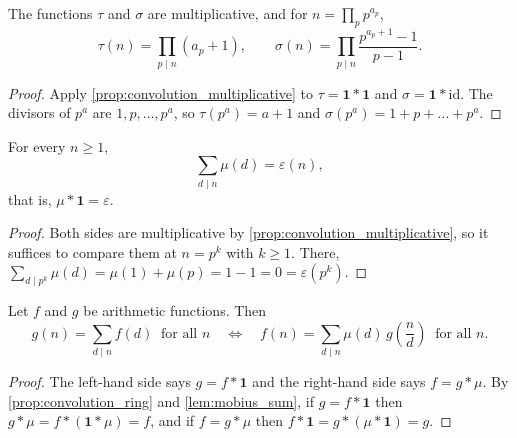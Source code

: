 \begin{corollary}\label{cor:tau_sigma}
    The functions $\tau$ and $\sigma$ are multiplicative, and for $n = \prod_p p^{a_p}$,
    \begin{equation*}
        \tau(n) = \prod_{p \mid n} (a_p + 1), \qquad \sigma(n) = \prod_{p \mid n} \frac{p^{a_p + 1} - 1}{p - 1}.
    \end{equation*}
\end{corollary}
\begin{proof}
    Apply \cref{prop:convolution_multiplicative} to $\tau = \mathbf{1} * \mathbf{1}$ and $\sigma = \mathbf{1} * \mathrm{id}$. The divisors of $p^a$ are $1, p, \dots, p^a$, so $\tau(p^a) = a + 1$ and $\sigma(p^a) = 1 + p + \dots + p^a$.
\end{proof}

\begin{lemma}\label{lem:mobius_sum}
    For every $n \ge 1$,
    \begin{equation*}
        \sum_{d \mid n} \mu(d) = \varepsilon(n),
    \end{equation*}
    that is, $\mu * \mathbf{1} = \varepsilon$.
\end{lemma}
\begin{proof}
    Both sides are multiplicative by \cref{prop:convolution_multiplicative}, so it suffices to compare them at $n = p^k$ with $k \ge 1$. There, $\sum_{d \mid p^k} \mu(d) = \mu(1) + \mu(p) = 1 - 1 = 0 = \varepsilon(p^k)$.
\end{proof}

\begin{theorem}\label{thm:mobius_inversion}
    Let $f$ and $g$ be arithmetic functions. Then
    \begin{equation*}
        g(n) = \sum_{d \mid n} f(d) \ \text{ for all } n \quad \Longleftrightarrow \quad f(n) = \sum_{d \mid n} \mu(d)\, g\!\left(\frac{n}{d}\right) \ \text{ for all } n.
    \end{equation*}
\end{theorem}
\begin{proof}
    The left-hand side says $g = f * \mathbf{1}$ and the right-hand side says $f = g * \mu$. By \cref{prop:convolution_ring} and \cref{lem:mobius_sum}, if $g = f * \mathbf{1}$ then $g * \mu = f * (\mathbf{1} * \mu) = f$, and if $f = g * \mu$ then $f * \mathbf{1} = g * (\mu * \mathbf{1}) = g$.
\end{proof}

